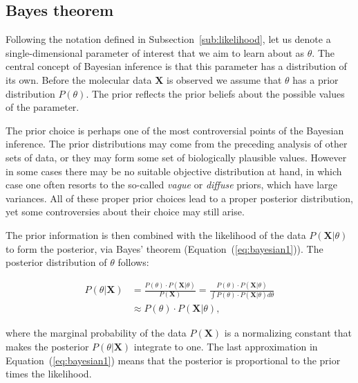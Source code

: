 \subsection{Bayes theorem\label{sub:bayesTheorem}}

Following the notation defined in Subsection~\ref{sub:likelihood}, let us denote a single-dimensional parameter of interest that we aim to learn about as $\theta$.
The central concept of Bayesian inference is that this parameter has a distribution of its own.
Before the molecular data $\mathbf{X}$ is observed we assume that $\theta$ has a prior distribution $P(\theta)$.
The prior reflects the prior beliefs about the possible values of the parameter.

The prior choice is perhaps one of the most controversial points of the Bayesian inference.
The prior distributions may come from the preceding analysis of other sets of data, or they may form some set of biologically plausible values.
However in some cases there may be no suitable objective distribution at hand, in which case one often resorts to the so-called \emph{vague} or \emph{diffuse} priors, which have large variances.
All of these proper prior choices lead to a proper posterior distribution, yet some controversies about their choice may still arise.

The prior information is then combined with the likelihood of the data $P\left( \mathbf{X} | \theta \right)$ to form the posterior, via Bayes' theorem (Equation~(\ref{eq:bayesian1})).
The posterior distribution of $\theta$ follows:

\begin{align}
P\left(\theta|\mathbf{X}\right) &= \frac{P(\theta)\cdot P\left(\mathbf{X}|\theta\right)}{P\left(\mathbf{X}\right)}=\frac{P(\theta)\cdot P\left(\mathbf{X}|\theta\right)}{\int P(\theta)\cdot P\left(\mathbf{X}|\theta\right)d\theta}  \nonumber \\
& \approx  P(\theta)\cdot P\left(\mathbf{X}|\theta\right),
\label{eq:bayesian1}
\end{align}

\noindent
where the marginal probability of the data $P\left(\mathbf{X}\right)$ is a normalizing constant that makes the posterior $P\left(\theta|\mathbf{X}\right)$ integrate to one.
The last approximation in Equation~(\ref{eq:bayesian1}) means that the posterior is proportional to the prior times the likelihood.

